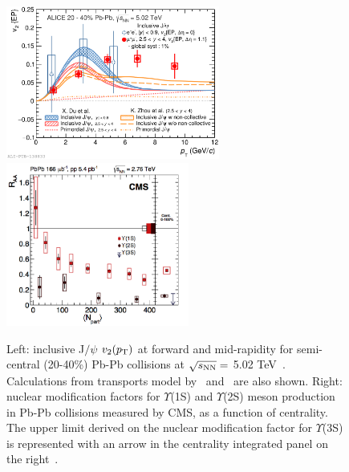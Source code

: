 \begin{figure}[!ht]
  \centering
  \includegraphics[width=7cm]{FigCap1/JPsiV2Models.pdf}
  \includegraphics[width=6cm]{FigCap1/RaaUpsilonCMS.png}
  \caption{Left: inclusive J$/\psi$ $v_2(p_{\rm T})$ at forward and mid-rapidity for semi-central (20-40\%) Pb-Pb collisions at $\sqrt{s_{\rm NN}} =$ 5.02 TeV~\cite{Acharya:2017tgv}. Calculations from transports model by~\cite{Du:2015wha} and~\cite{Zhou:2014kka} are also shown. Right: nuclear modification factors for $\Upsilon$(1S) and $\Upsilon$(2S) meson production in Pb-Pb collisions measured by CMS, as a function of centrality.
The upper limit derived on the nuclear modification factor for $\Upsilon$(3S) is represented with an arrow in the centrality integrated panel on the right~\cite{Khachatryan:2016xxp}. }
  \label{fig:JPsi}
\end{figure}

